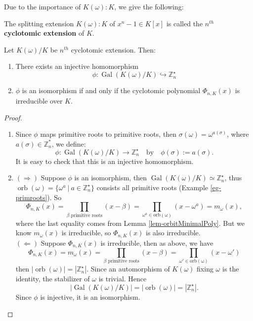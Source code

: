 Due to the importance of $K(\omega):K$, we give the following:
\begin{definition}
The splitting extension $K(\omega):K$ of $x^n-1 \in K[x]$ is called the {\bf $n^{th}$ cyclotomic extension} of $K$.   
\end{definition}

\begin{theorem}
Let $ K(\omega)/K $ be $n^{th}$ cyclotomic extension. Then:
\begin{enumerate}
    \item There exists an injective homomorphism
    $$
    \phi: \operatorname{Gal}(K(\omega)/K) \hookrightarrow \mathbb{Z}_n^\star
    $$
    
    \item $\phi$ is an isomorphism if and only if the cyclotomic polynomial $\Phi_{n,K}(x)$ is irreducible over $K$.
\end{enumerate}
\end{theorem}
\begin{proof}
    \begin{enumerate}
        \item Since $\phi$ maps primitive roots to primitive roots, then $\sigma(\omega)=\omega^{a(\sigma)}$, where $a(\sigma)\in \mathbb{Z}_n^*$, we define: $$\phi:\operatorname{Gal}(K(\omega)/K) \rightarrow \mathbb{Z}_n^\star \quad \text{by} \quad \phi(\sigma):=a(\sigma).$$
        It is easy to check that this is an injective homomorphism.
        \item $(\Rightarrow)$ Suppose $\phi$ is an isomorphism, then $ \operatorname{Gal}(K(\omega)/K) \simeq \mathbb{Z}_n^\star $, thus $\operatorname{orb}(\omega)=\{\omega^{a} \ |\ a \in \mathbb{Z}_n^\star \}$ consists all primitive roots (Example \ref{eg-primroots}). So
        $$\Phi_{n,K}(x)=\prod_{\beta \text{ primitive roots}} (x-\beta) = \prod_{\omega^a \in \operatorname{orb(\omega)}}(x-\omega^a)=m_\omega(x),$$
        where the last equality comes from Lemma \ref{lem-orbitMinimalPoly}. But we know $m_\omega  (x) $ is irreducible, so $\Phi_{n,K}(x)$ is also irreducible.
        \\
        $(\Leftarrow)$ Suppose $\Phi_{n,K}(x) $ is irreducible, then as above, we have 
        $$\Phi_{n,K}(x)=m_\omega(x)=\prod_{\beta \text{ primitive  roots}}(x-\beta) =  \prod_{\omega' \in \operatorname{orb(\omega)}}(x-\omega')$$
        then $|\operatorname{orb}(\omega)|=|\mathbb{Z}_n^\star|$. Since an automorphism of $K(\omega)$ fixing $\omega$ is the identity, the stabilizer of $\omega$ is trivial. Hence
        \[
        |\operatorname{Gal}(K(\omega)/K)|=|\operatorname{orb}(\omega)|=|\mathbb{Z}_n^\star|.
        \]
        Since $\phi$ is injective, it is an isomorphism.
    \end{enumerate}
\end{proof}

